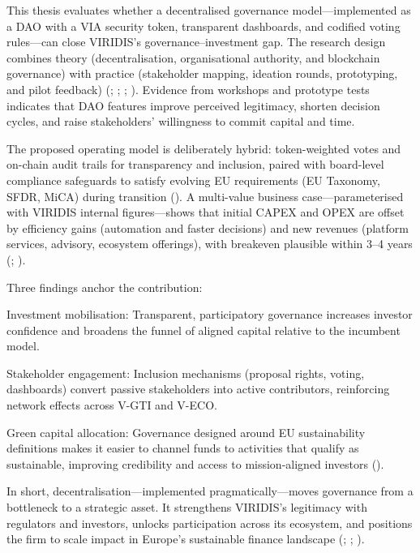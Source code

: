 \documentclass[
  english,
  12pt,
  oneside,
  open=any]{scrbook}
\begin{document}
This thesis evaluates whether a decentralised governance
model---implemented as a DAO with a VIA security token, transparent
dashboards, and codified voting rules---can close VIRIDIS's
governance--investment gap. The research design combines theory
(decentralisation, organisational authority, and blockchain governance)
with practice (stakeholder mapping, ideation rounds, prototyping, and
pilot feedback) (; ;
;
).
Evidence from workshops and prototype tests indicates that DAO features
improve perceived legitimacy, shorten decision cycles, and raise
stakeholders' willingness to commit capital and time.

The proposed operating model is deliberately hybrid: token-weighted
votes and on-chain audit trails for transparency and inclusion, paired
with board-level compliance safeguards to satisfy evolving EU
requirements (EU Taxonomy, SFDR, MiCA) during transition
(). A multi-value business case---parameterised with VIRIDIS
internal figures---shows that initial CAPEX and OPEX are offset by
efficiency gains (automation and faster decisions) and new revenues
(platform services, advisory, ecosystem offerings), with breakeven
plausible within 3--4 years
(;
).

Three findings anchor the contribution:

Investment mobilisation: Transparent, participatory governance increases
investor confidence and broadens the funnel of aligned capital relative
to the incumbent model.

Stakeholder engagement: Inclusion mechanisms (proposal rights, voting,
dashboards) convert passive stakeholders into active contributors,
reinforcing network effects across V-GTI and V-ECO.

Green capital allocation: Governance designed around EU sustainability
definitions makes it easier to channel funds to activities that qualify
as sustainable, improving credibility and access to mission-aligned
investors
().

In short, decentralisation---implemented pragmatically---moves
governance from a bottleneck to a strategic asset. It strengthens
VIRIDIS's legitimacy with regulators and investors, unlocks
participation across its ecosystem, and positions the firm to scale
impact in Europe's sustainable finance landscape
(;
;
).
\end{document}
